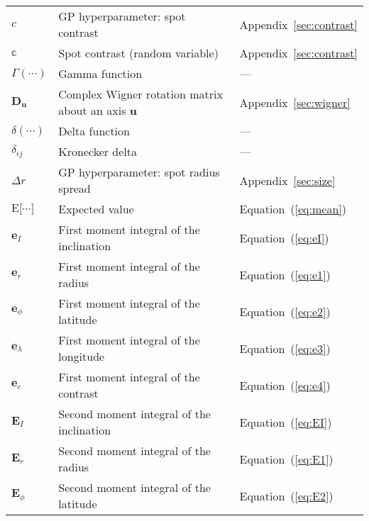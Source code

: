 \begin{center}
\begin{longtable}{W{c}{1cm} W{l}{9cm} W{l}{2cm}}
        \\
        $c$
         & GP hyperparameter: spot contrast
         & Appendix~\ref{sec:contrast}
        \\
        $\mathbb{c}$
         & Spot contrast (random variable)
         & Appendix~\ref{sec:contrast}
        \\
        $\Gamma(\cdots)$
         & Gamma function
         & ---
        \\
        $\mathbf{D}_\mathbf{u}$
         & Complex Wigner rotation matrix about an axis $\mathbf{u}$
         & Appendix~\ref{sec:wigner}
        \\
        $\delta(\cdots)$
         & Delta function
         & ---
        \\
        $\delta_{ij}$
         & Kronecker delta
         & ---
        \\
        $\Delta r$
         & GP hyperparameter: spot radius spread
         & Appendix~\ref{sec:size}
        \\
        $\mathrm{E}\big[ \cdots \big]$
         & Expected value
         & Equation~(\ref{eq:mean})
        \\
        $\mathbf{e}_I$
         & First moment integral of the inclination
         & Equation~(\ref{eq:eI})
        \\
        $\mathbf{e}_r$
         & First moment integral of the radius
         & Equation~(\ref{eq:e1})
        \\
        $\mathbf{e}_\phi$
         & First moment integral of the latitude
         & Equation~(\ref{eq:e2})
        \\
        $\mathbf{e}_\lambda$
         & First moment integral of the longitude
         & Equation~(\ref{eq:e3})
        \\
        $\mathbf{e}_c$
         & First moment integral of the contrast
         & Equation~(\ref{eq:e4})
        \\
        $\mathbf{E}_I$
         & Second moment integral of the inclination
         & Equation~(\ref{eq:EI})
        \\
        $\mathbf{E}_r$
         & Second moment integral of the radius
         & Equation~(\ref{eq:E1})
        \\
        $\mathbf{E}_\phi$
         & Second moment integral of the latitude
         & Equation~(\ref{eq:E2})
        \\

\end{longtable}
\end{center}
